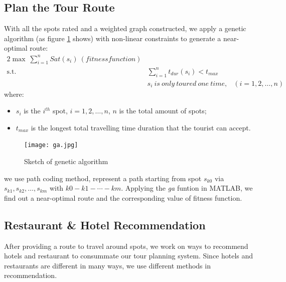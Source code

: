 \documentclass{mcmthesis}
\begin{document}
\subsection{Plan the Tour Route}
  With all the spots rated and a weighted graph constructed, we apply a genetic algorithm (as figure \ref{fig:ga} shows) with non-linear constraints to generate a near-optimal route:
  \begin{alignat}{2}   %
    \max~\sum_{i=1}^{n}Sat(s_{i})~(fitness function)\\
    \mbox{s.t.}\quad
    &\sum_{i=1}^{n}t_{dur}(s_{i}) < t_{max}\\
    &s_{i}~is~only~toured~one~time, & (i=1,2,\ldots,n)
  \end{alignat}
  where:
  \begin{itemize}
    \item $s_{i}$ is the $i^{th}$ spot, $i=1,2,\ldots,n$, $n$ is the total amount of spots;
    \item $t_{max}$ is the longest total travelling time duration that the tourist can accept.
  \end{itemize}
  \begin{figure}[ht]
    \centering
    \texttt{[image: ga.jpg]}
    \caption{Sketch of genetic algorithm}
    \label{fig:ga}
  \end{figure}
  we use path coding method, represent a path starting from spot $s_{k0}$ via $s_{k1}, s_{k2},\ldots,s_{km}$ with $k0-k1-\cdots-km$. Applying the \emph{ga} funtion in MATLAB, we find out a near-optimal route and the corresponding value of fitness function.

  



\subsection{Restaurant \& Hotel Recommendation}
  After providing a route to travel around spots, we work on ways to recommend hotels and restaurant to consummate our tour planning system. Since hotels and restaurants are different in many ways, we use different methods in recommendation.
\end{document}
